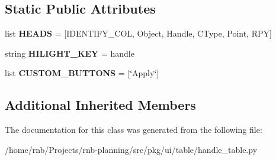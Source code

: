 \subsection*{Static Public Attributes}
\begin{DoxyCompactItemize}
\item 
\mbox{\label{classrnb-planning_1_1src_1_1pkg_1_1ui_1_1table_1_1handle__table_1_1_handle_table_ae7465641653d9ae164cb98af800595df}} 
list {\bfseries H\+E\+A\+DS} = \mbox{[}I\+D\+E\+N\+T\+I\+F\+Y\+\_\+\+C\+OL, \textquotesingle{}Object\textquotesingle{}, \textquotesingle{}Handle\textquotesingle{}, \textquotesingle{}C\+Type\textquotesingle{}, \textquotesingle{}Point\textquotesingle{}, \textquotesingle{}R\+PY\textquotesingle{}\mbox{]}
\item 
\mbox{\label{classrnb-planning_1_1src_1_1pkg_1_1ui_1_1table_1_1handle__table_1_1_handle_table_abffd13d185c383be85cd42505f7adb58}} 
string {\bfseries H\+I\+L\+I\+G\+H\+T\+\_\+\+K\+EY} = \textquotesingle{}handle\textquotesingle{}
\item 
\mbox{\label{classrnb-planning_1_1src_1_1pkg_1_1ui_1_1table_1_1handle__table_1_1_handle_table_aab031eff180c2613f6d1b3fe9cfb2162}} 
list {\bfseries C\+U\+S\+T\+O\+M\+\_\+\+B\+U\+T\+T\+O\+NS} = \mbox{[}\char`\"{}Apply\char`\"{}\mbox{]}
\end{DoxyCompactItemize}
\subsection*{Additional Inherited Members}


The documentation for this class was generated from the following file\+:\begin{DoxyCompactItemize}
\item 
/home/rnb/\+Projects/rnb-\/planning/src/pkg/ui/table/handle\+\_\+table.\+py\end{DoxyCompactItemize}
